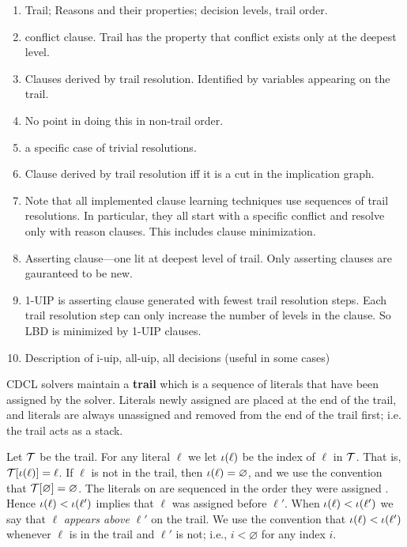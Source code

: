 \documentclass[runningheads]{llncs}
\begin{document}
\begin{enumerate}
\item Trail; Reasons and their properties; decision levels, trail order.
\item conflict clause. Trail has the property that conflict exists
    only at the deepest level.
\item Clauses derived by trail resolution. Identified by variables
    appearing on the trail.
\item No point in doing this in non-trail order.
\item a specific case of trivial resolutions.
\item Clause derived by trail resolution iff it is a cut in the
    implication graph.
\item Note that all implemented clause learning techniques use
    sequences of trail resolutions. In particular, they all start with
    a specific conflict and resolve only with reason clauses.
    This includes clause minimization.
\item Asserting clause---one lit at deepest level of trail. Only
    asserting clauses are gauranteed to be new.
\item 1-UIP is asserting clause generated with fewest trail resolution
    steps. Each trail resolution step can only increase the number of
    levels in the clause. So LBD is minimized by 1-UIP clauses.
\item Description of i-uip, all-uip, all decisions (useful in some cases)
\end{enumerate}

CDCL \sat solvers maintain a \textbf{trail} which is a sequence of
literals that have been assigned \true by the solver. Literals newly
assigned \true are placed at the end of the trail, and literals are
always unassigned and removed from the end of the trail first;
i.e. the trail acts as a stack.

Let $\mathcal{T}$ be the trail. For any literal $\ell$ we let
$\iota(\ell)$ be the index of $\ell$ in $\mathcal{T}$. That is,
$\mathcal{T}[\iota(\ell)] = \ell$. If $\ell$ is not in the trail, then
$\iota(\ell) = \varnothing$, and we use the convention that
$\mathcal{T}[\varnothing] = \varnothing$. The literals on \trail are
sequenced in the order they were assigned \true. Hence
$\iota(\ell) < \iota(\ell')$ implies that $\ell$ was assigned
\true before $\ell'$. When $\iota(\ell) < \iota(\ell')$ we say
that $\ell$ \textit{appears above} $\ell'$ on the trail. We use the
convention that $\iota(\ell) < \iota(\ell')$ whenever $\ell$
is in the trail and $\ell'$ is not; i.e., $i < \varnothing$ for any
index $i$.
\end{document}
